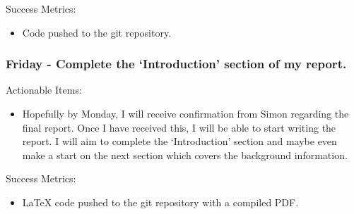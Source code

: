 Success Metrics:

\begin{itemize}
    \item Code pushed to the git repository.
\end{itemize}


\subsubsection{Friday - Complete the `Introduction' section of my report.}

Actionable Items:

\begin{itemize}
    \item Hopefully by Monday, I will receive confirmation from Simon regarding the final report. Once I have received this, I will be able to start writing the report. I will aim to complete the `Introduction' section and maybe even make a start on the next section which covers the background information.
\end{itemize}

Success Metrics:

\begin{itemize}
    \item LaTeX code pushed to the git repository with a compiled PDF.
\end{itemize}
